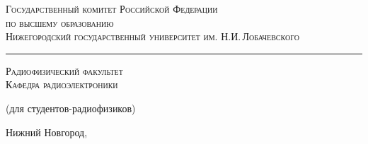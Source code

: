 \begin{titlepage}

\begin{center}

{\small\textsc{Государственный комитет Российской Федерации \\ по высшему образованию}}
\\
{\small\textsc{Нижегородский государственный университет им. Н.И.\,Лобачевского}}

\vskip 3pt \hrule \vskip 10pt
{\small\textsc{Радиофизический факультет}}
\\
{\small\textsc{Кафедра радиоэлектроники}}



\vfill

{\Large \bfseries \labtheme}

{\small{(для студентов-радиофизиков)}}
	
\end{center}

\vfill
		

\begin{center}
	Нижний Новгород, \the\year
\end{center}

\end{titlepage}

